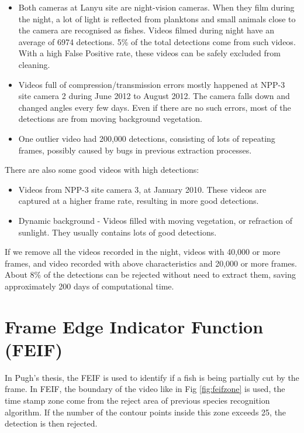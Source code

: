 \documentclass[bsc,logo,twoside,fullspacing,parskip]{infthesis}
\begin{document}
\begin{itemize}
\item
Both cameras at Lanyu site are night-vision cameras. When they film during the night, a lot of light is reflected from planktons and small animals close to the camera are recognised as fishes. Videos filmed during night have an average of 6974 detections. 
5\% of the total detections come from such videos. 
With a high False Positive rate, these videos can be safely excluded from cleaning.
\item
Videos full of compression/transmission errors mostly happened at NPP-3 site camera 2 during June 2012 to August 2012. The camera falls down and changed angles every few days. Even if there are no such errors, most of the detections are from moving background vegetation.
\item
One outlier video had 200,000 detections, consisting of lots of repeating frames, possibly caused by bugs in previous extraction processes.
\end{itemize}
There are also some good videos with high detections: 
\begin{itemize}
\item
Videos from NPP-3 site camera 3, at January 2010. These videos are captured at a higher frame rate, resulting in more good detections.
\item
Dynamic background - Videos filled with moving vegetation, or refraction of sunlight. They usually contains lots of good detections.
\end{itemize}

If we remove all the videos recorded in the night, videos with 40,000 or more frames, and video recorded with above characteristics and 20,000 or more frames. About 8\% of the detections can be rejected without need to extract them, saving approximately 200 days of computational time.

\section{Frame Edge Indicator Function (FEIF)}

In Pugh's thesis\cite{Pugh}, the FEIF is used to identify if a fish is being partially cut by the frame. 
In FEIF, the boundary of the video like in Fig \ref{fig:feifzone} is used, the time stamp zone come from the reject area of previous species recognition algorithm. 
If the number of the contour points inside this zone exceeds 25, the detection is then rejected.
\end{document}
